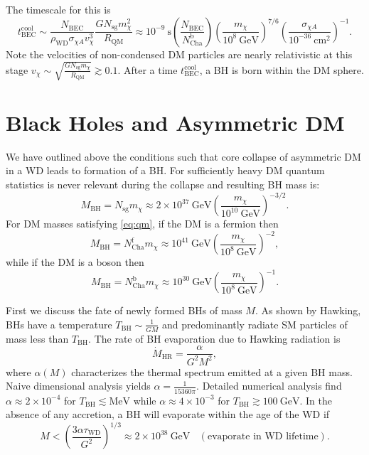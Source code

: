 \documentclass[preprintnumbers,amsmath,amssymb,prd,superscriptaddress]{revtex4}
\newcommand{\GeV}{\text{GeV}}
\newcommand{\MeV}{\text{MeV}}
\newcommand{\cm}{\text{cm}}
\def\r{\right)}
\def\l{\left(}
\begin{document}
The timescale for this is
\begin{equation}
\label{eq:tbec}
t^\text{cool}_\text{BEC} \sim \frac{N_\text{BEC}}{\rho_\text{WD} \sigma_{\chi A}v_\chi^3} \frac{G N_\text{sg} m_\chi^2}{R_\text{QM}} \approx 10^{-9} ~\text{s} \l \frac{N_\text{BEC}}{N^\text{b}_\text{Cha}} \r \l \frac{m_\chi}{10^{8} ~\GeV} \r^{7/6} \l \frac{\sigma_{\chi A}}{10^{-36} ~\cm^2} \r^{-1}.
\end{equation}
Note the velocities of non-condensed DM particles are nearly relativistic at this stage $v_\chi \sim \sqrt{\frac{G N_\text{sg} m_\chi}{R_\text{QM}}} \gtrsim 0.1$. 
After a time $t^\text{cool}_\text{BEC}$, a BH is born within the DM sphere. 

\section{Black Holes and Asymmetric DM}
We have outlined above the conditions such that core collapse of asymmetric DM in a WD leads to formation of a BH. 
For sufficiently heavy DM quantum statistics is never relevant during the collapse and resulting BH mass is:
\begin{equation}
M_\text{BH} = N_\text{sg} m_\chi \approx 2 \times 10^{37} ~\GeV \l \frac{m_\chi}{10^{10} ~\GeV} \r^{-3/2}.
\end{equation} 
For DM masses satisfying \eqref{eq:qm}, if the DM is a fermion then
\begin{equation}
M_\text{BH} = N^\text{f}_\text{Cha} m_\chi \approx 10^{41} ~\GeV \l \frac{m_\chi}{10^{8} ~\GeV} \r^{-2},
\end{equation} 
while if the DM is a boson then
\begin{equation}
\label{eq:BHboson}
M_\text{BH} = N^\text{b}_\text{Cha} m_\chi \approx 10^{30} ~\GeV \l \frac{m_\chi}{10^{8} ~\GeV} \r^{-1}.
\end{equation} 

First we discuss the fate of newly formed BHs of mass $M$. 
As shown by Hawking, BHs have a temperature $T_\text{BH} \sim \frac{1}{G M}$ and predominantly radiate SM particles of mass less than $T_\text{BH}$. 
The rate of BH evaporation due to Hawking radiation is
\begin{equation}
\dot{M}_\text{HR} = \frac{\alpha}{G^2 M^2},
\end{equation}
where $\alpha(M)$ characterizes the thermal spectrum emitted at a given BH mass.
Naive dimensional analysis yields $\alpha = \frac{1}{15360 \pi}$. 
Detailed numerical analysis find $\alpha \approx 2 \times 10^{-4}$ for $T_\text{BH} \lesssim \MeV$ while $\alpha \approx 4 \times 10^{-3}$ for $T_\text{BH} \gtrsim 100 ~\GeV$. 
In the absence of any accretion, a BH will evaporate within the age of the WD if
\begin{equation}
\label{eq:HRlife}
M < \l \frac{3 \alpha \tau_\text{WD}}{G^2}\r^{1/3} \approx 2 \times 10^{38} ~\GeV~~~~ (\text{evaporate in WD lifetime}). 
\end{equation}
\end{document}
